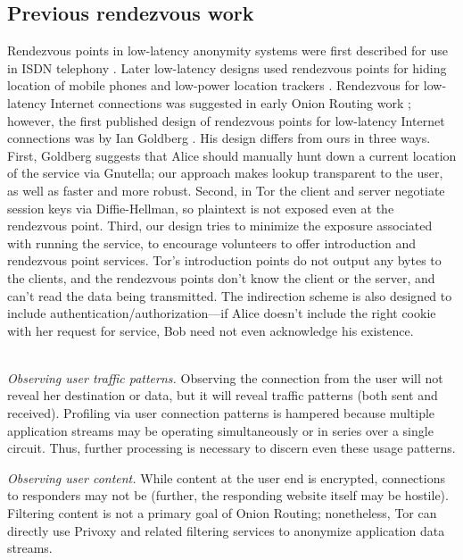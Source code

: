\documentclass[times,10pt,twocolumn]{article}
\begin{document}
\subsection{Previous rendezvous work}

Rendezvous points in low-latency anonymity systems were first
described for use in ISDN telephony \cite{isdn-mixes,jerichow-jsac98}.
Later low-latency designs used rendezvous points for hiding location
of mobile phones and low-power location trackers
\cite{federrath-ih96,reed-protocols97}.  Rendezvous for low-latency
Internet connections was suggested in early Onion Routing work
\cite{or-ih96}; however, the first published design of rendezvous
points for low-latency Internet connections was by Ian Goldberg
\cite{ian-thesis}. His design differs from
ours in three ways. First, Goldberg suggests that Alice should manually
hunt down a current location of the service via Gnutella; our approach
makes lookup transparent to the user, as well as faster and more robust.
Second, in Tor the client and server negotiate session keys
via Diffie-Hellman, so plaintext is not exposed even at the rendezvous point. Third,
our design tries to minimize the exposure associated with running the
service, to encourage volunteers to offer introduction and rendezvous
point services. Tor's introduction points do not output any bytes to the
clients, and the rendezvous points don't know the client or the server,
and can't read the data being transmitted. The indirection scheme is
also designed to include authentication/authorization---if Alice doesn't
include the right cookie with her request for service, Bob need not even
acknowledge his existence.

\label{sec:attacks}


\\
\emph{Observing user traffic patterns.} Observing the connection
from the user will not reveal her destination or data, but it will
reveal traffic patterns (both sent and received). Profiling via user
connection patterns is hampered because multiple application streams may
be operating simultaneously or in series over a single circuit. Thus,
further processing is necessary to discern even these usage patterns.
  
\emph{Observing user content.} While content at the user end is encrypted,
connections to responders may not be (further, the responding website
itself may be hostile). Filtering content is not a primary goal of Onion
Routing; nonetheless, Tor can directly use Privoxy and related
filtering services to anonymize application data streams.
\end{document}
